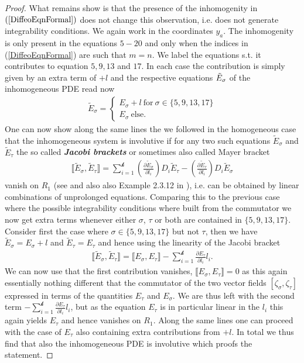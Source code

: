\documentclass[a4paper,12pt, DIV=14, BCOR=5mm, twoside, headsepline]{scrbook}
\begin{document}
\begin{proof}
What remains show is that the presence of the inhomogenity in $(\ref{DiffeoEqnFormal})$ does not change this observation, i.e. does not generate integrability conditions. We again work in the coordinates $y_a$. The inhomogenity is only present in the equations $5-20$ and only when the indices in (\ref{DiffeoEqnFormal}) are such that $m = n$. We label the equations s.t. it contributes to equation $5,9,13$ and $17$. In each case the contribution is simply given by an extra term of $+l$ and the respective equations $\Tilde{E}_{\sigma}$ of the inhomogeneous PDE read now 
\begin{align}
     \tilde{E}_{\sigma} = \begin{cases}
     E_{\sigma} + l \ \text{for} \ \sigma \in \{ 5,9,13,17 \}\\
     E_{\sigma} \ \text{else}.
     \end{cases}
\end{align}
One can now show along the same lines the we followed in the homogeneous case that the inhomogeneous system is involutive if for any two such equations $\tilde{E}_{\sigma}$ and $\tilde{E}_{\tau}$ the so called \textit{\textbf{Jacobi brackets}} or sometimes also called Mayer bracket 
\begin{align}
  \llbracket \tilde{E}_{\sigma}, \tilde{E}_{\tau} \rrbracket = \sum _{i = 1}^{\mathcal{k}} (\frac{\partial \tilde{E}_{\sigma}}{\partial l_i}) D_{i}\tilde{E}_{\tau} -  (\frac{\partial \tilde{E}_{\tau}}{\partial l_i}) D_{i}\tilde{E}_{\sigma} 
\end{align}
vanish on $R_1$ (see  \cite{seiler1994analysis} and also also Example 2.3.12 in \cite{seiler2009involution}), i.e. can be obtained by linear combinations of unprolonged equations. Comparing this to the previous case where the possible integrability conditions where built from the commutator we now get extra terms whenever either $\sigma$, $\tau$ or both are contained in $\{ 5,9,13,17 \}$. Consider first the case where $\sigma \in \{5,9,13,17\}$ but not $\tau$, then we have $\tilde{E}_{\sigma} = E_{\sigma} + l$ and $\tilde{E}_{\tau} = E_{\tau}$ and hence using the linearity of the Jacobi bracket
\begin{align}
    \llbracket \tilde{E}_{\sigma}, \tilde{E}_{\tau} \rrbracket = \llbracket E_{\sigma}, E_{\tau} \rrbracket - \sum_{i=1}^{\mathcal{k}} \frac{\partial E_{\tau}}{\partial l_i} l_i.
\end{align}
We can now use that the first contribution vanishes, $\llbracket E_{\sigma}, E_{\tau} \rrbracket = 0$ as this again essentially nothing different that the commutator of the two vector fields $[\zeta_{\sigma},\zeta_{\tau}]$ expressed in terms of the quantities $E_{\tau}$ and $E_{\sigma}$. We are thus left with the second term $- \sum_{i=1}^{\mathcal{k}} \frac{\partial E_{\tau}}{\partial l_i} l_i$, but as the equation $E_{\tau}$ is in particular linear in the $l_i$ this again yields $E_{\tau}$ and hence vanishes on $R_1$. Along the same lines one can proceed with the case of $E_{\tau}$ also containing extra contributions from $+l$. In total we thus find that also the inhomogeneous PDE is involutive which proofs the statement.
\end{proof}
\end{document}
